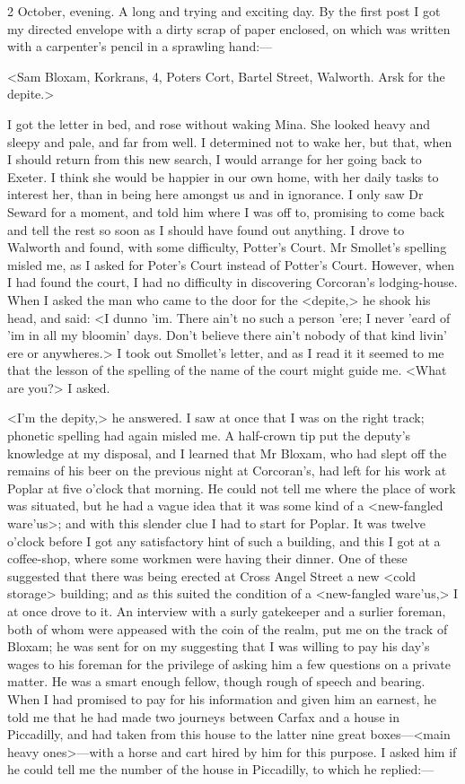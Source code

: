  
\begin{diary}{2 October, evening.}
A long and trying and exciting day. By the first post I got my directed envelope with a dirty scrap of paper enclosed, on which was written with a carpenter's pencil in a sprawling hand:—

<Sam Bloxam, Korkrans, 4, Poters Cort, Bartel Street, Walworth. Arsk for the depite.>

I got the letter in bed, and rose without waking Mina. She looked heavy and sleepy and pale, and far from well. I determined not to wake her, but that, when I should return from this new search, I would arrange for her going back to Exeter. I think she would be happier in our own home, with her daily tasks to interest her, than in being here amongst us and in ignorance. I only saw Dr Seward for a moment, and told him where I was off to, promising to come back and tell the rest so soon as I should have found out anything. I drove to Walworth and found, with some difficulty, Potter's Court. Mr Smollet's spelling misled me, as I asked for Poter's Court instead of Potter's Court. However, when I had found the court, I had no difficulty in discovering Corcoran's lodging-house. When I asked the man who came to the door for the <depite,> he shook his head, and said: <I dunno 'im. There ain't no such a person 'ere; I never 'eard of 'im in all my bloomin' days. Don't believe there ain't nobody of that kind livin' ere or anywheres.> I took out Smollet's letter, and as I read it it seemed to me that the lesson of the spelling of the name of the court might guide me. <What are you?> I asked.

<I'm the depity,> he answered. I saw at once that I was on the right track; phonetic spelling had again misled me. A half-crown tip put the deputy's knowledge at my disposal, and I learned that Mr Bloxam, who had slept off the remains of his beer on the previous night at Corcoran's, had left for his work at Poplar at five o'clock that morning. He could not tell me where the place of work was situated, but he had a vague idea that it was some kind of a <new-fangled ware'us>; and with this slender clue I had to start for Poplar. It was twelve o'clock before I got any satisfactory hint of such a building, and this I got at a coffee-shop, where some workmen were having their dinner. One of these suggested that there was being erected at Cross Angel Street a new <cold storage> building; and as this suited the condition of a <new-fangled ware'us,> I at once drove to it. An interview with a surly gatekeeper and a surlier foreman, both of whom were appeased with the coin of the realm, put me on the track of Bloxam; he was sent for on my suggesting that I was willing to pay his day's wages to his foreman for the privilege of asking him a few questions on a private matter. He was a smart enough fellow, though rough of speech and bearing. When I had promised to pay for his information and given him an earnest, he told me that he had made two journeys between Carfax and a house in Piccadilly, and had taken from this house to the latter nine great boxes—<main heavy ones>—with a horse and cart hired by him for this purpose. I asked him if he could tell me the number of the house in Piccadilly, to which he replied:—


\end{diary}
